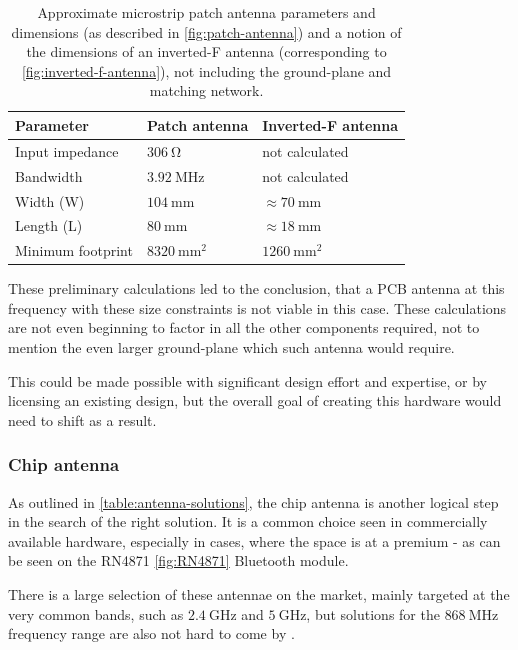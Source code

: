 \begin{table}[H]
\begin{center}
\caption{\label{table:antenna-pcb-calculations}Approximate microstrip patch antenna parameters and dimensions (as described in \ref{fig:patch-antenna}) and a notion of the dimensions of an inverted-F antenna (corresponding to \ref{fig:inverted-f-antenna}), not including the ground-plane and matching network.}
    \begin{tabular}{|l|l|l|} \hline
    \textbf{Parameter}  & \textbf{Patch antenna}    & \textbf{Inverted-F antenna} \\ \hline
    Input impedance     & $306~\mathrm{\Omega}$     & not calculated \\ \hline
    Bandwidth           & $3.92~\mathrm{MHz}$       & not calculated \\ \hline
    Width (W)           & $104~\mathrm{mm}$         & $\approx 70~\mathrm{mm}$ \\ \hline
    Length (L)          & $80~\mathrm{mm}$          & $\approx 18~\mathrm{mm}$ \\ \hline
    Minimum footprint   & $8320~\mathrm{mm^2}$      & $1260~\mathrm{mm^2}$ \\ \hline
    \end{tabular}
\end{center}
\end{table}

These preliminary calculations led to the conclusion, that a PCB antenna at this frequency with these size constraints is not viable in this case. These calculations are not even beginning to factor in all the other components required, not to mention the even larger ground-plane which such antenna would require. 

This could be made possible with significant design effort and expertise, or by licensing an existing design, but the overall goal of creating this hardware would need to shift as a result.

\subsubsection{Chip antenna}
As outlined in \ref{table:antenna-solutions}, the chip antenna is another logical step in the search of the right solution. It is a common choice seen in commercially available hardware, especially in cases, where the space is at a premium - as can be seen on the RN4871 \ref{fig:RN4871} Bluetooth module.

There is a large selection of these antennae on the market, mainly targeted at the very common bands, such as $2.4~\mathrm{GHz}$ and $5~\mathrm{GHz}$, but solutions for the $868~\mathrm{MHz}$ frequency range are also not hard to come by \cite{digikey_rf_2024,mouser_europe_868_2024}.

